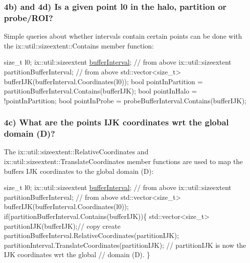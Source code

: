 \subsubsection*{4b) and 4d) Is a given point l0 in the halo, partition or probe/\+R\+OI?}

Simple queries about whether intervals contain certain points can be done with the ix\+::util\+::sizeextent\+::\+Contains member function\+:


\begin{DoxyCode}
\textcolor{keywordtype}{size\_t} l0;
ix::util::sizeextent \hyperlink{SATKernels_8H_a4caa6f5ca62531b8c31e22919f206d68}{bufferInterval};          \textcolor{comment}{// from above}
ix::util::sizeextent partitionBufferInterval; \textcolor{comment}{// from above}
std::vector<size\_t> bufferIJK(bufferInterval.Coordinates(l0));
\textcolor{keywordtype}{bool} pointInPartition = partitionBufferInterval.Contains(bufferIJK);
\textcolor{keywordtype}{bool} pointInHalo      = !pointInPartition;
\textcolor{keywordtype}{bool} pointInProbe     = probeBufferInterval.Contains(bufferIJK);
\end{DoxyCode}


\subsubsection*{4c) What are the point\textquotesingle{}s I\+JK coordinates wrt the global domain (D)?}

The ix\+::util\+::sizeextent\+::\+Relative\+Coordinates and ix\+::util\+::sizeextent\+::\+Translate\+Coordinates member functions are used to map the buffer\textquotesingle{}s I\+JK coordinates to the global domain (D)\+:


\begin{DoxyCode}
\textcolor{keywordtype}{size\_t} l0;
ix::util::sizeextent \hyperlink{SATKernels_8H_a4caa6f5ca62531b8c31e22919f206d68}{bufferInterval};          \textcolor{comment}{// from above}
ix::util::sizeextent partitionBufferInterval; \textcolor{comment}{// from above}
std::vector<size\_t> bufferIJK(bufferInterval.Coordinates(l0));
\textcolor{keywordflow}{if}(partitionBufferInterval.Contains(bufferIJK))\{
  std::vector<size\_t> partitionIJK(bufferIJK);\textcolor{comment}{// copy create}
  partitionBufferInterval.RelativeCoordinates(partitionIJK);
  partitionInterval.TranslateCoordinates(partitionIJK);
  \textcolor{comment}{// partitionIJK is now the IJK coordinates wrt the global}
  \textcolor{comment}{// domain (D).}
\}
\end{DoxyCode}
 